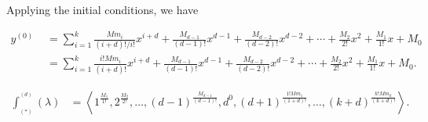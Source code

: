 \documentclass[11pt]{amsart}
\theoremstyle{remark}
\theoremstyle{definition}
\theoremstyle{remark}
\numberwithin{equation}{section}
\begin{document}
Applying the initial conditions, we have 

\begin{equation} \label{IVC.111}
\begin{aligned}
	y^{(0)}	& \,\, =  \sum_{i=1}^{k}  \frac{M m_i}{(i+d)!/i!} x^{i+d} + \frac{M_{d-1} }{(d-1)!} x^{d-1}  +  \frac{M_{d-2} }{(d-2)!} x^{d-2} + \cdots +  \frac{M_{2}}{2!} x^2  +   \frac{M_{1}}{1!} x + M_0\\
	& \,\, =  \sum_{i=1}^{k} \frac{i! M m_i}{(i+d)!} x^{i+d} + \frac{M_{d-1} }{(d-1)!} x^{d-1}  +  \frac{M_{d-2} }{(d-2)!} x^{d-2} + \cdots +  \frac{M_{2}}{2!} x^2  +   \frac{M_{1}}{1!} x + M_0.
\end{aligned}	
\end{equation}



\begin{align}\label{sequence112}
\int^{\!^{(d)}}_{\!_{(*)}} (\lambda) 
&=\left\langle1^{ \frac{M_{1} }{1!}  },2^{  \frac{M_{2} }{2!} } ,\dots,(d-1)^{\frac{M_{d-1} }{(d-1)!} }, d^{0}, (d+1)^{\frac{1! M m_1}{(1+d)!}},   \dots, (k+d)^{\frac{k! M m_k}{(k+d)!} } \right\rangle.
\end{align}	
\end{document}
